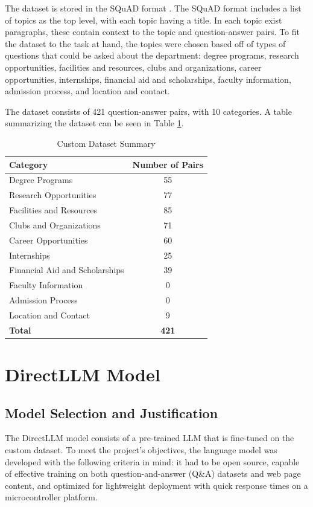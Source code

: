 \documentclass[conference]{IEEEtran}
\begin{document}
The dataset is stored in the SQuAD format \cite{b7}. 
The SQuAD format includes a list of topics as the top level, with each topic having a title. 
In each topic exist paragraphs, these contain context to the topic and question-answer pairs.
To fit the dataset to the task at hand, the topics were chosen based off of types of questions that could be asked about the department:
degree programs, research opportunities, facilities and resources, clubs and organizations, career opportunities, internships, financial aid and scholarships, faculty information, admission process, and location and contact.

The dataset consists of 421 question-answer pairs, with 10 categories.
A table summarizing the dataset can be seen in Table \ref{tab:dataset}.
\begin{table}[h]
    \centering
    \caption{Custom Dataset Summary}
    \begin{tabular}{l|c}
        \toprule
        \textbf{Category} & \textbf{Number of Pairs} \\
        \midrule
        Degree Programs & 55 \\
        Research Opportunities & 77 \\
        Facilities and Resources & 85 \\
        Clubs and Organizations & 71 \\
        Career Opportunities & 60 \\
        Internships & 25 \\
        Financial Aid and Scholarships & 39 \\
        Faculty Information & 0 \\
        Admission Process & 0 \\
        Location and Contact & 9 \\
        \bottomrule
        \textbf{Total} & \textbf{421} \\
    \end{tabular}
    \label{tab:dataset}
\end{table}

\section{DirectLLM Model}
\subsection{Model Selection and Justification}
The DirectLLM model consists of a pre-trained LLM that is fine-tuned on the custom dataset.
To meet the project's objectives, the language model was developed with the following criteria in mind: it had to be open source, capable of effective training on both question-and-answer (Q\&A) datasets and web page content, and optimized for lightweight deployment with quick response times on a microcontroller platform.
\end{document}

